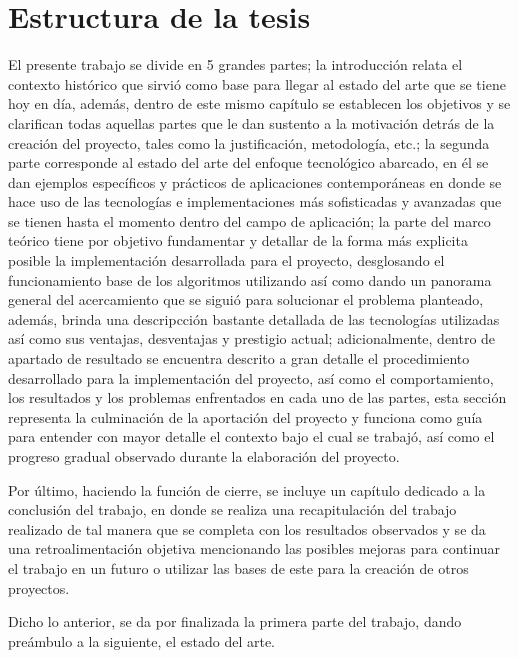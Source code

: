 \section{Estructura de la tesis}
El presente trabajo se divide en 5 grandes partes; la introducción relata el contexto histórico que sirvió como base para llegar al estado del arte que se tiene hoy en día, además, dentro de este mismo capítulo se establecen los objetivos y se clarifican todas aquellas partes que le dan sustento a la motivación detrás de la creación del proyecto, tales como la justificación, metodología, etc.; la segunda parte corresponde al estado del arte del enfoque tecnológico abarcado, en él se dan ejemplos específicos y prácticos de aplicaciones contemporáneas en donde se hace uso de las tecnologías e implementaciones más sofisticadas y avanzadas que se tienen hasta el momento dentro del campo de aplicación; la parte del marco teórico tiene por objetivo fundamentar y detallar de la forma más explicita posible la implementación desarrollada para el proyecto, desglosando el funcionamiento base de los algoritmos utilizando así como dando un panorama general del acercamiento que se siguió para solucionar el problema planteado, además, brinda una descripcción bastante detallada de las tecnologías utilizadas así como sus ventajas, desventajas y prestigio actual; adicionalmente, dentro de apartado de resultado se encuentra descrito a gran detalle el procedimiento desarrollado para la implementación del proyecto, así como el comportamiento, los resultados y los problemas enfrentados en cada uno de las partes, esta sección representa la culminación de la aportación del proyecto y funciona como guía para entender con mayor detalle el contexto bajo el cual se trabajó, así como el progreso gradual observado durante la elaboración del proyecto.

Por último, haciendo la función de cierre, se incluye un capítulo dedicado a la conclusión del trabajo, en donde se realiza una recapitulación del trabajo realizado de tal manera que se completa con los resultados observados y se da una retroalimentación objetiva mencionando las posibles mejoras para continuar el trabajo en un futuro o utilizar las bases de este para la creación de otros proyectos.

Dicho lo anterior, se da por finalizada la primera parte del trabajo, dando preámbulo a la siguiente, el estado del arte.